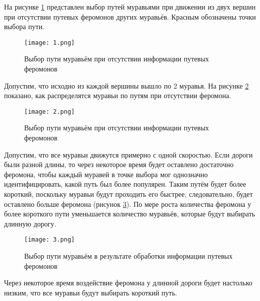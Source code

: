 \documentclass[12pt,a4paper]{scrartcl}
\begin{document}
На рисунке \ref{graph2.1} представлен выбор путей муравьями при движении из двух вершин при отсутствии путевых феромонов других муравьёв. Красным обозначены точки выбора пути. 
\begin{figure}[h!]
	\centering
	\texttt{[image: 1.png]}
	\caption{Выбор пути муравьём при отсутствии информации путевых феромонов}
	\label{graph2.1}
\end{figure}

Допустим, что исходно из каждой вершины вышло по 2 муравья. На рисунке \ref{graph2.2} показано, как распределятся муравьи по путям при отсутствии феромона.
\begin{figure}[h!]
	\centering
	\texttt{[image: 2.png]}
	\caption{Выбор пути муравьём при отсутствии информации путевых феромонов}
	\label{graph2.2}
\end{figure}

Допустим, что все муравьи движутся примерно с одной скоростью. Если дороги были разной длины, то через некоторое время будет оставлено достаточно феромона, чтобы каждый муравей в точке выбора мог однозначно идентифицировать, какой путь был более популярен. 
Таким путём будет более короткий, поскольку муравьи будут проходить его быстрее, следовательно, будет оставлено больше феромона (рисунок \ref{graph2.3}). По мере роста количества феромона у более короткого пути уменьшается количество муравьёв, которые будут выбирать длинную дорогу. 
\begin{figure}[h!]
	\centering
	\texttt{[image: 3.png]}
	\caption{Выбор пути муравьём в результате обработки информации путевых феромонов}
	\label{graph2.3}
\end{figure}

Через некоторое время воздействие феромона у длинной дороги будет настолько низким, что все муравьи будут выбирать короткий путь.\cite{ACS}
\end{document}
